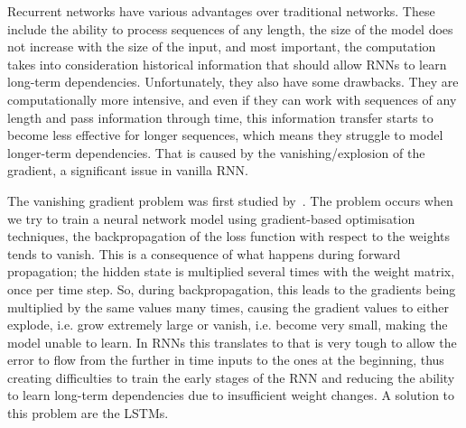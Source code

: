 Recurrent networks have various advantages over traditional networks. These include the ability to process sequences of any length, the size of the model does not increase with the size of the input, and most important, the computation takes into consideration historical information that should allow RNNs to learn long-term dependencies. Unfortunately, they also have some drawbacks. They are computationally more intensive, and even if they can work with sequences of any length and pass information through time, this information transfer starts to become less effective for longer sequences, which means they struggle to model longer-term dependencies. That is caused by the vanishing/explosion of the gradient, a significant issue in vanilla RNN. 

The vanishing gradient problem was first studied by~\cite{Hochreiter:91, bengio1994vanishing}. The problem occurs when we try to train a neural network model using gradient-based optimisation techniques, the backpropagation of the loss function with respect to the weights tends to vanish. This is a consequence of what happens during forward propagation; the hidden state is multiplied several times with the weight matrix, once per time step. So, during backpropagation, this leads to the gradients being multiplied by the same values many times, causing the gradient values to either explode, i.e. grow extremely large or vanish, i.e. become very small, making the model unable to learn. In RNNs this translates to that is very tough to allow the error to flow from the further in time inputs to the ones at the beginning, thus creating difficulties to train the early stages of the RNN and reducing the ability to learn long-term dependencies due to insufficient weight changes. A solution to this problem are the LSTMs.



